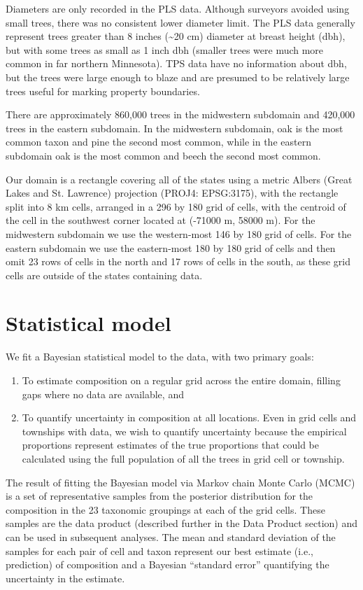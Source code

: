 \documentclass[12pt]{article}
\begin{document}
Diameters are only recorded in the PLS data. Although surveyors avoided
using small trees, there was no consistent lower diameter limit. The
PLS data generally represent trees greater than 8 inches (\textasciitilde{}20
cm) diameter at breast height (dbh), but with some trees as small
as 1 inch dbh (smaller trees were much more common in far northern
Minnesota). TPS data have no information about dbh, but the trees
were large enough to blaze and are presumed to be relatively large
trees useful for marking property boundaries.

There are approximately 860,000 trees in the midwestern subdomain
and 420,000 trees in the eastern subdomain. In the midwestern subdomain,
oak is the most common taxon and pine the second most common, while
in the eastern subdomain oak is the most common and beech the second
most common.

Our domain is a rectangle covering all of the states using a metric
Albers (Great Lakes and St. Lawrence) projection (PROJ4: EPSG:3175),
with the rectangle split into 8 km cells, arranged in a 296 by 180
grid of cells, with the centroid of the cell in the southwest corner
located at (-71000 m, 58000 m). For the midwestern subdomain we use
the western-most 146 by 180 grid of cells. For the eastern subdomain
we use the eastern-most 180 by 180 grid of cells and then omit 23
rows of cells in the north and 17 rows of cells in the south, as these
grid cells are outside of the states containing data.


\section{Statistical model\label{sec:Statistical-model}}

We fit a Bayesian statistical model to the data, with two primary
goals:
\begin{enumerate}
\item To estimate composition on a regular grid across the entire domain,
filling gaps where no data are available, and
\item To quantify uncertainty in composition at all locations. Even in grid
cells and townships with data, we wish to quantify uncertainty because
the empirical proportions represent estimates of the true proportions
that could be calculated using the full population of all the trees
in grid cell or township.
\end{enumerate}
The result of fitting the Bayesian model via Markov chain Monte Carlo
(MCMC) is a set of representative samples from the posterior distribution
for the composition in the 23 taxonomic groupings at each of the grid
cells. These samples are the data product (described further in the
Data Product section) and can be used in subsequent analyses. The
mean and standard deviation of the samples for each pair of cell and
taxon represent our best estimate (i.e., prediction) of composition
and a Bayesian ``standard error'' quantifying the uncertainty in
the estimate. 
\end{document}
